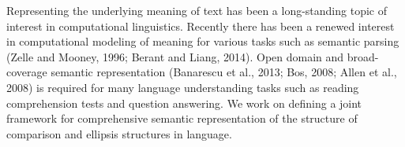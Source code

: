 Representing the underlying meaning of text has been a long-standing topic of interest in computational linguistics. Recently there has been a renewed interest in computational modeling of meaning for various tasks such as semantic parsing (Zelle and Mooney, 1996; Berant and Liang, 2014). Open domain and broad-coverage semantic representation (Banarescu et al., 2013; Bos, 2008; Allen et al., 2008) is required for many language understanding tasks such as reading comprehension tests and question answering. We work on defining a joint framework for comprehensive semantic representation of the structure of comparison and ellipsis structures in language.
